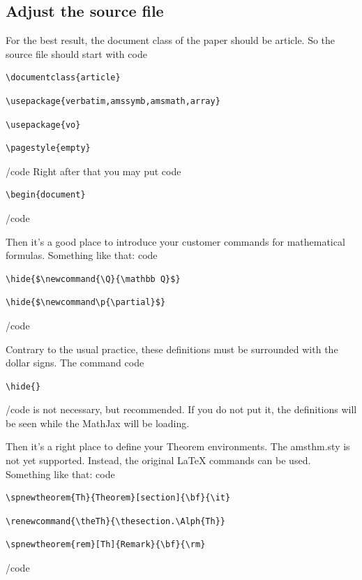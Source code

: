 \documentclass{article}
\begin{document}
\subsection{Adjust the source file}\label{s2.1}
For the best result, the document class of the paper should be
article. So the source file should start with\newline
\<code\>
\begin{verbatim}
\documentclass{article}
\end{verbatim}
\newline
\begin{verbatim} 
\usepackage{verbatim,amssymb,amsmath,array}
\end{verbatim}
\newline
\begin{verbatim} 
\usepackage{vo}
\end{verbatim}
\newline
\begin{verbatim} 
\pagestyle{empty}
\end{verbatim}
\</code\>
Right after that you may put 
\<code\>
\begin{verbatim} 
\begin{document}
\end{verbatim}
\</code\>

Then it's a good place to introduce your customer commands for mathematical
formulas. Something like that:\newline
\<code\>
\begin{verbatim} 
\hide{$\newcommand{\Q}{\mathbb Q}$} 
\end{verbatim}
\newline
\begin{verbatim} 
\hide{$\newcommand\p{\partial}$} 
\end{verbatim}
\</code\>

Contrary to the usual practice, these definitions must be surrounded
with the dollar signs. The command \newline
\<code\>
\begin{verbatim} 
\hide{}
\end{verbatim}
\</code\>
\newline
is not necessary, but recommended. If you do not put it, the definitions
will be seen while the MathJax will be loading.

Then it's a right place to define your Theorem environments.
The amsthm.sty is not yet supported. Instead, the original LaTeX
commands can be used. Something like that:\newline
\<code\>
\begin{verbatim} 
\spnewtheorem{Th}{Theorem}[section]{\bf}{\it}
\end{verbatim}
\newline
\begin{verbatim} 
\renewcommand{\theTh}{\thesection.\Alph{Th}}
\end{verbatim}
\newline
\begin{verbatim} 
\spnewtheorem{rem}[Th]{Remark}{\bf}{\rm}
\end{verbatim} 
\</code\>
\end{document}
